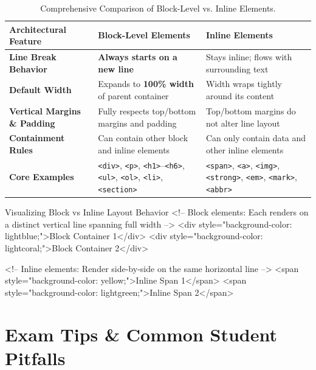 \begin{table}[htbp]
\centering
\small
\renewcommand{\arraystretch}{1.3}
\begin{tabularx}{\linewidth}{l>{\raggedright\arraybackslash}X>{\raggedright\arraybackslash}X}
\toprule
\textbf{Architectural Feature} & \textbf{Block-Level Elements} & \textbf{Inline Elements} \\
\midrule
\textbf{Line Break Behavior} & \textbf{Always starts on a new line} & Stays inline; flows with surrounding text \\
\textbf{Default Width} & Expands to \textbf{100\% width} of parent container & Width wraps tightly around its content \\
\textbf{Vertical Margins \& Padding} & Fully respects top/bottom margins and padding & Top/bottom margins do not alter line layout \\
\textbf{Containment Rules} & Can contain other block and inline elements & Can only contain data and other inline elements \\
\textbf{Core Examples} & \texttt{<div>}, \texttt{<p>}, \texttt{<h1>}--\texttt{<h6>}, \texttt{<ul>}, \texttt{<ol>}, \texttt{<li>}, \texttt{<section>} & \texttt{<span>}, \texttt{<a>}, \texttt{<img>}, \texttt{<strong>}, \texttt{<em>}, \texttt{<mark>}, \texttt{<abbr>} \\
\bottomrule
\end{tabularx}
\caption{Comprehensive Comparison of Block-Level vs. Inline Elements.}
\label{tab:block-vs-inline}
\end{table}

\begin{htmlcode}{Visualizing Block vs Inline Layout Behavior}
<!-- Block elements: Each renders on a distinct vertical line spanning full width -->
<div style="background-color: lightblue;">Block Container 1</div>
<div style="background-color: lightcoral;">Block Container 2</div>

<!-- Inline elements: Render side-by-side on the same horizontal line -->
<span style="background-color: yellow;">Inline Span 1</span>
<span style="background-color: lightgreen;">Inline Span 2</span>
\end{htmlcode}

\section{Exam Tips \& Common Student Pitfalls}

